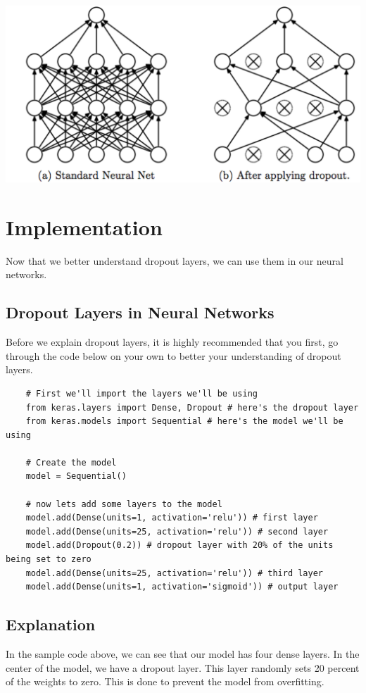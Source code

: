 \documentclass[11pt]{report}
\begin{document}
\begin{center}
    \includegraphics[scale=0.2]{dropoutexample.png}
\end{center}



\chapter{Implementation}
Now that we better understand dropout layers, we can use them in our neural networks.

\section{Dropout Layers in Neural Networks}
Before we explain dropout layers, it is highly recommended that you first, go through the code below on your own to better your understanding of dropout layers.

\begin{verbatim}
    # First we'll import the layers we'll be using
    from keras.layers import Dense, Dropout # here's the dropout layer
    from keras.models import Sequential # here's the model we'll be using

    # Create the model
    model = Sequential()

    # now lets add some layers to the model
    model.add(Dense(units=1, activation='relu')) # first layer
    model.add(Dense(units=25, activation='relu')) # second layer
    model.add(Dropout(0.2)) # dropout layer with 20% of the units being set to zero
    model.add(Dense(units=25, activation='relu')) # third layer
    model.add(Dense(units=1, activation='sigmoid')) # output layer
\end{verbatim}

\section{Explanation}
In the sample code above, we can see that our model has four dense layers. In the center of the model, we have a dropout layer. This layer randomly sets 20 percent of the weights to zero. This is done to prevent the model from overfitting. 
\end{document}
